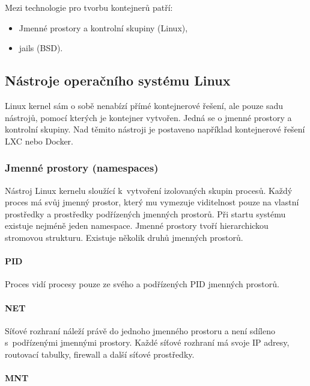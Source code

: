 {
Mezi technologie pro tvorbu kontejnerů patří:

\begin{itemize}
	\item Jmenné prostory a kontrolní skupiny (Linux),
	\item jails (BSD).
\end{itemize}
}

\subsection{Nástroje operačního systému Linux}

Linux kernel sám o sobě nenabízí přímé kontejnerové řešení, ale pouze sadu nástrojů, pomocí kterých je kontejner vytvořen.
Jedná se o jmenné prostory a kontrolní skupiny.
Nad těmito nástroji je postaveno například kontejnerové řešení LXC nebo Docker.

\subsubsection{Jmenné prostory (namespaces)}

Nástroj Linux kernelu sloužící k~vytvoření izolovaných skupin procesů.
Každý proces má svůj jmenný prostor, který mu vymezuje viditelnost pouze na vlastní prostředky a prostředky podřízených jmenných prostorů.
Při startu systému existuje nejméně jeden namespace.
Jmenné prostory tvoří hierarchickou stromovou strukturu.
Existuje několik druhů jmenných prostorů.

\paragraph{PID}

Proces vidí procesy pouze ze svého a podřízených PID jmenných prostorů.
\cite{pid_namespaces}

\paragraph{NET}

Síťové rozhraní náleží právě do jednoho jmenného prostoru a není sdíleno s~podřízenými jmennými prostory.
Každé síťové rozhraní má svoje IP adresy, routovací tabulky, firewall a další síťové prostředky. 
\cite{namespaces}

\paragraph{MNT}

